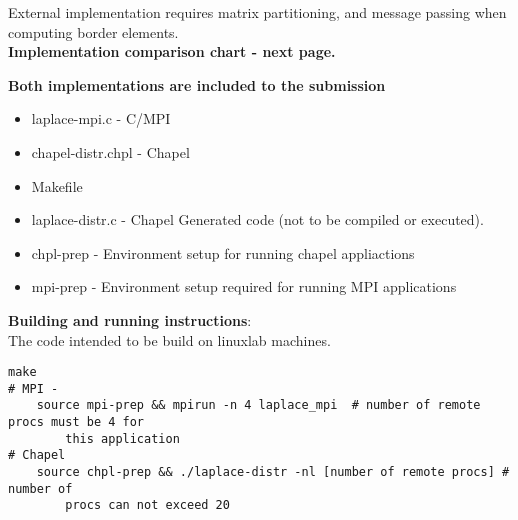 \documentclass{article}
\begin{document}
        External implementation requires matrix partitioning, and message passing when computing
        border elements.\\
        
        \textbf{Implementation comparison chart - next page.}

        \textbf{Both implementations are included to the submission} 
        

        \begin{itemize}
            \item laplace-mpi.c - C/MPI
            \item chapel-distr.chpl - Chapel
            \item Makefile
            \item laplace-distr.c - Chapel Generated code (not to be compiled or executed).
            \item chpl-prep - Environment setup for running chapel appliactions
            \item mpi-prep - Environment setup required for running MPI applications
        \end{itemize}
        \textbf{Building and running instructions}:\\ 
        
        The code intended to be build on linuxlab machines.
        \begin{lstlisting}
make
# MPI -
    source mpi-prep && mpirun -n 4 laplace_mpi  # number of remote procs must be 4 for 
        this application
# Chapel
    source chpl-prep && ./laplace-distr -nl [number of remote procs] # number of 
        procs can not exceed 20 
        \end{lstlisting}

        \pagebreak
\end{document}
